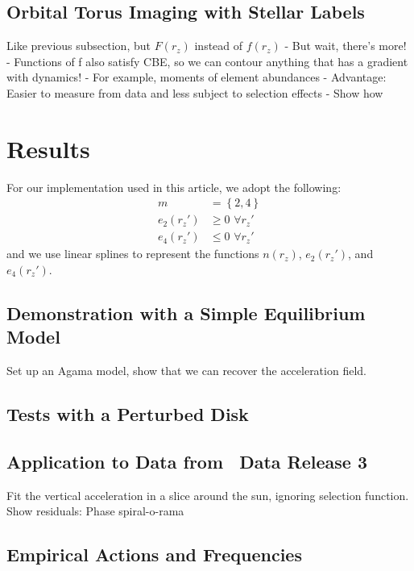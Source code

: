 \subsection{Orbital Torus Imaging with Stellar Labels} \label{sec:oti-labels}
Like previous subsection, but $F(r_z)$ instead of $f(r_z)$
- But wait, there's more!
- Functions of f also satisfy CBE, so we can contour anything that has a gradient with dynamics!
- For example, moments of element abundances
- Advantage: Easier to measure from data and less subject to selection effects
- Show how


\section{Results} \label{sec:results}

For our implementation used in this article, we adopt the following:
\begin{align}
    m &= \left\{2, 4\right\} \\
    e_2(r_z') &\geq 0 \,\,\forall r_z'\\
    e_4(r_z') &\leq 0 \,\,\forall r_z'
\end{align}
and we use linear splines to represent the functions $n(r_z)$, $e_2(r_z')$, and
$e_4(r_z')$.


\subsection{Demonstration with a Simple Equilibrium Model}
\label{sec:eq-model}

Set up an Agama model, show that we can recover the acceleration field.


\subsection{Tests with a Perturbed Disk}
\label{sec:diseq-disk}

\subsection{Application to Data from \gaia\ Data Release 3}

Fit the vertical acceleration in a slice around the sun, ignoring selection function.
Show residuals: Phase spiral-o-rama

\subsection{Empirical Actions and Frequencies}
\label{sec:gaiadr3}


